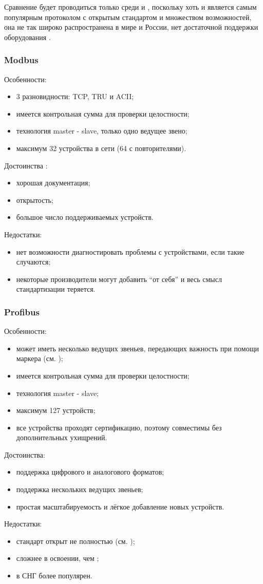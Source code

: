 Сравнение будет проводиться только среди \mb и \pb, поскольку хоть \ffb и является самым популярным протоколом с открытым стандартом и множеством возможностей, она не так широко распространена в мире и России, нет достаточной поддержки оборудования \cite{__2001, _foundation_1999}. 

\subsubsection{Modbus}
\noindent Особенности:
\begin{itemize}
	\item 3 разновидности: TCP, TRU и ACII;
	\item имеется контрольная сумма для проверки целостности;
	\item технология master - slave, только одно ведущее звено;
	\item максимум 32 устройства в сети (64 с повторителями).
\end{itemize}
Достоинства \cite{van_gorp_advanced_2009}:
\begin{itemize}
	\item хорошая документация;
	\item открытость;
	\item большое число поддерживаемых устройств.
\end{itemize}
Недостатки:
\begin{itemize}
	\item нет возможности диагностировать проблемы с устройствами, если такие случаются;
	\item некоторые производители могут добавить ``от себя'' и весь смысл стандартизации теряется.
\end{itemize}
\subsubsection{Profibus}
\noindent Особенности:
\begin{itemize}
	\item может иметь несколько ведущих звеньев, передающих важность при помощи маркера (см. );
	\item имеется контрольная сумма для проверки целостности;
	\item технология master - slave;
	\item максимум 127 устройств;
	\item все устройства проходят сертификацию, поэтому совместимы без дополнительных ухищрений.
\end{itemize}
Достоинства:
\begin{itemize}
	\item поддержка цифрового и аналогового форматов;
	\item поддержка нескольких ведущих звеньев;
	\item простая масштабируемость и лёгкое добавление новых устройств.
\end{itemize}
Недостатки:
\begin{itemize}
	\item стандарт открыт не полностью (см. \cite{__2020});
	\item сложнее в освоении, чем \mb;
	\item в СНГ \mb более популярен.
\end{itemize}
